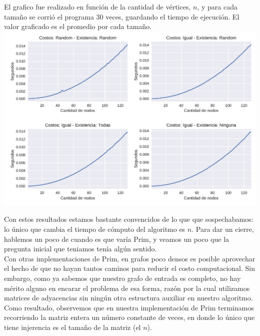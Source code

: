 El grafico fue realizado en función de la cantidad de vértices, $n$, y para cada tamaño se corrió el programa 30 veces,
guardando el tiempo de ejecución. El valor graficado es el promedio por cada tamaño. \\

{\centering
  \includegraphics[width=1\textwidth]{imagenes/problema3/todos.pdf} \\
}

Con estos resultados estamos bastante convencidos de lo que que sospechabamos: lo único que cambia el tiempo de cómputo del algoritmo es $n$. Para dar un cierre, hablemos un poco de cuando es que varía Prim, y veamos un poco que la pregunta inicial que teniamos tenía algún sentido. \\

Con otras implementaciones de Prim, en grafos poco densos es posible aprovechar el hecho de que no hayan tantos caminos para reducir el costo computacional. Sin embargo, como ya sabemos que nuestro grafo de entrada es completo, no hay mérito alguno en encarar el problema de esa forma, razón por la cual utilizamos matrices de adyacencias sin ningún otra estructura auxiliar en nuestro algoritmo. Como resultado, observemos que en nuestra implementación de Prim terminamos recorriendo la matriz entera un número constante de veces, en donde lo único que tiene injerencia es el tamaño de la matriz (el $n$).
